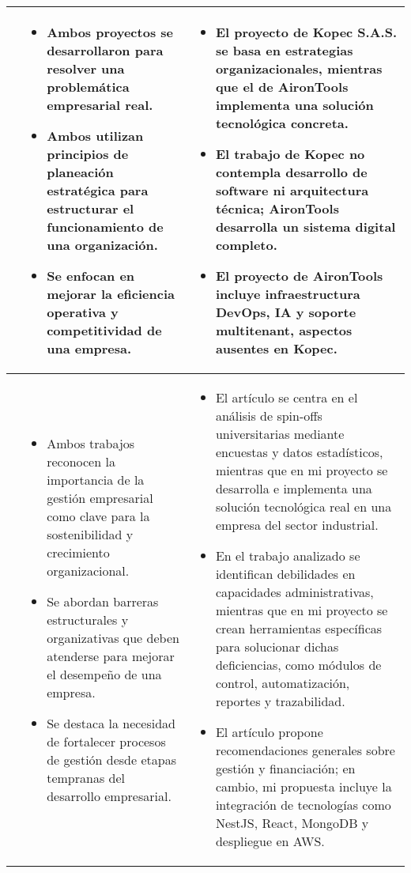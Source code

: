 \begin{longtable}{m{.05\paperwidth} *{2}{m{.33\paperwidth}} @{}}
\cite{Patino19} &
\begin{itemize}[topsep=0pt,itemsep=0pt,parsep=0pt,partopsep=0pt,leftmargin=*]
	\item Ambos proyectos se desarrollaron para resolver una problemática empresarial real.
	\item Ambos utilizan principios de planeación estratégica para estructurar el funcionamiento de una organización.
	\item Se enfocan en mejorar la eficiencia operativa y competitividad de una empresa.
\end{itemize} &
\begin{itemize}[topsep=0pt,itemsep=0pt,parsep=0pt,partopsep=0pt,leftmargin=*]
	\item El proyecto de Kopec S.A.S. se basa en estrategias organizacionales, mientras que el de AironTools implementa una solución tecnológica concreta.
	\item El trabajo de Kopec no contempla desarrollo de software ni arquitectura técnica; AironTools desarrolla un sistema digital completo.
	\item El proyecto de AironTools incluye infraestructura DevOps, IA y soporte multitenant, aspectos ausentes en Kopec.
\end{itemize} \\
\midrule

\cite{Rodeiro2012} &
\begin{itemize}[topsep=0pt,itemsep=0pt,parsep=0pt,partopsep=0pt,leftmargin=*]
	\item Ambos trabajos reconocen la importancia de la gestión empresarial como clave para la sostenibilidad y crecimiento organizacional.
	\item Se abordan barreras estructurales y organizativas que deben atenderse para mejorar el desempeño de una empresa.
	\item Se destaca la necesidad de fortalecer procesos de gestión desde etapas tempranas del desarrollo empresarial.
\end{itemize} &
\begin{itemize}[topsep=0pt,itemsep=0pt,parsep=0pt,partopsep=0pt,leftmargin=*]
	\item El artículo se centra en el análisis de spin-offs universitarias mediante encuestas y datos estadísticos, mientras que en mi proyecto se desarrolla e implementa una solución tecnológica real en una empresa del sector industrial.
	\item En el trabajo analizado se identifican debilidades en capacidades administrativas, mientras que en mi proyecto se crean herramientas específicas para solucionar dichas deficiencias, como módulos de control, automatización, reportes y trazabilidad.
	\item El artículo propone recomendaciones generales sobre gestión y financiación; en cambio, mi propuesta incluye la integración de tecnologías como NestJS, React, MongoDB y despliegue en AWS.
\end{itemize} \\
\midrule


\end{longtable}
